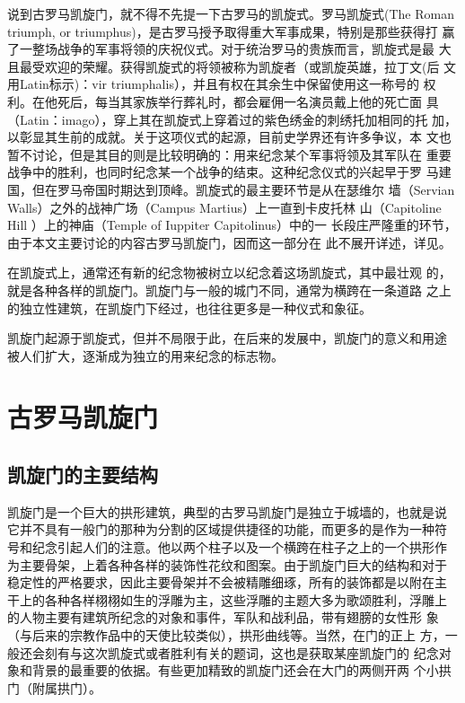 \documentclass[a4paper,dvipdfm]{article}
\begin{document}
说到古罗马凯旋门，就不得不先提一下古罗马的凯旋式。罗马凯旋式(The Roman
triumph, or triumphus)，是古罗马授予取得重大军事成果，特别是那些获得打
赢了一整场战争的军事将领的庆祝仪式。对于统治罗马的贵族而言，凯旋式是最
大且最受欢迎的荣耀。获得凯旋式的将领被称为凯旋者（或凯旋英雄，拉丁文(后
文用Latin标示)：vir triumphalis），并且有权在其余生中保留使用这一称号的
权利。在他死后，每当其家族举行葬礼时，都会雇佣一名演员戴上他的死亡面
具（Latin：imago），穿上其在凯旋式上穿着过的紫色绣金的刺绣托加相同的托
加，以彰显其生前的成就。关于这项仪式的起源，目前史学界还有许多争议，本
文也暂不讨论，但是其目的则是比较明确的：用来纪念某个军事将领及其军队在
重要战争中的胜利，也同时纪念某一个战争的结束。这种纪念仪式的兴起早于罗
马建国，但在罗马帝国时期达到顶峰。凯旋式的最主要环节是从在瑟维尔
墙（Servian Walls）之外的战神广场（Campus Martius）上一直到卡皮托林
山（Capitoline Hill ）上的神庙（Temple of Iuppiter Capitolinus）中的一
长段庄严隆重的环节，由于本文主要讨论的内容古罗马凯旋门，因而这一部分在
此不展开详述，详见。

在凯旋式上，通常还有新的纪念物被树立以纪念着这场凯旋式，其中最壮观
的，就是各种各样的凯旋门。凯旋门与一般的城门不同，通常为横跨在一条道路
之上的独立性建筑，在凯旋门下经过，也往往更多是一种仪式和象征。

凯旋门起源于凯旋式，但并不局限于此，在后来的发展中，凯旋门的意义和用途
被人们扩大，逐渐成为独立的用来纪念的标志物。

\section{古罗马凯旋门}

\subsection{凯旋门的主要结构}

凯旋门是一个巨大的拱形建筑，典型的古罗马凯旋门是独立于城墙的，也就是说
它并不具有一般门的那种为分割的区域提供捷径的功能，而更多的是作为一种符
号和纪念引起人们的注意。他以两个柱子以及一个横跨在柱子之上的一个拱形作
为主要骨架，上着各种各样的装饰性花纹和图案。由于凯旋门巨大的结构和对于
稳定性的严格要求，因此主要骨架并不会被精雕细琢，所有的装饰都是以附在主
干上的各种各样栩栩如生的浮雕为主，这些浮雕的主题大多为歌颂胜利，浮雕上
的人物主要有建筑所纪念的对象和事件，军队和战利品，带有翅膀的女性形
象（与后来的宗教作品中的天使比较类似），拱形曲线等。当然，在门的正上
方，一般还会刻有与这次凯旋式或者胜利有关的题词，这也是获取某座凯旋门的
纪念对象和背景的最重要的依据。有些更加精致的凯旋门还会在大门的两侧开两
个小拱门（附属拱门）。
\end{document}
